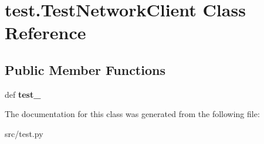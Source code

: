\hypertarget{classtest_1_1_test_network_client}{\section{test.\-Test\-Network\-Client \-Class \-Reference}
\label{classtest_1_1_test_network_client}
}
\subsection*{\-Public \-Member \-Functions}
\begin{DoxyCompactItemize}
\item 
\hypertarget{classtest_1_1_test_network_client_a78d057e96ed185dbaac67a9e67a29d44}{def {\bfseries test\-\_\-}}\label{classtest_1_1_test_network_client_a78d057e96ed185dbaac67a9e67a29d44}

\end{DoxyCompactItemize}


\-The documentation for this class was generated from the following file\-:\begin{DoxyCompactItemize}
\item 
src/test.\-py\end{DoxyCompactItemize}
